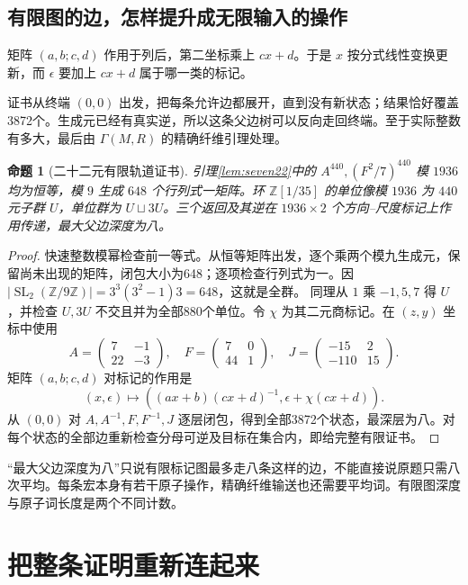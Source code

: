 \documentclass[11pt,a4paper,oneside,openany]{book}
\newcommand{\Z}{\mathbb Z}
\newcommand{\SL}{\operatorname{SL}}
\newtheorem{proposition}[theorem]{命题}
\theoremstyle{definition}
\numberwithin{equation}{chapter}
\begin{document}
\section{有限图的边，怎样提升成无限输入的操作}
矩阵 $(a,b;c,d)$ 作用于列后，第二坐标乘上 $cx+d$。于是 $x$ 按分式线性变换更新，而 $\epsilon$ 要加上 $cx+d$ 属于哪一类的标记。

证书从终端 $(0,0)$ 出发，把每条允许边都展开，直到没有新状态；结果恰好覆盖3872个。生成元已经有真实逆，所以这条父边树可以反向走回终端。至于实际整数有多大，最后由 $\Gamma(M,R)$ 的精确纤维引理处理。
\begin{proposition}[二十二元有限轨道证书]\label{prop:seven-certificate}
引理\ref{lem:seven22}中的 $A^{440},(F^2/7)^{440}$ 模 $1936$ 均为恒等，模 $9$ 生成 $648$ 个行列式一矩阵。环 $\Z[1/35]$ 的单位像模 $1936$ 为 $440$ 元子群 $U$，单位群为 $U\sqcup3U$。三个返回及其逆在 $1936\times2$ 个方向--尺度标记上作用传递，最大父边深度为八。
\end{proposition}
\begin{proof}
快速整数模幂检查前一等式。从恒等矩阵出发，逐个乘两个模九生成元，保留尚未出现的矩阵，闭包大小为648；逐项检查行列式为一。因 $|\SL_2(\Z/9\Z)|=3^3(3^2-1)3=648$，这就是全群。
同理从 $1$ 乘 $-1,5,7$ 得 $U$，并检查 $U,3U$ 不交且并为全部880个单位。令 $\chi$ 为其二元商标记。在 $(z,y)$ 坐标中使用
\[
A=\begin{pmatrix}7&-1\\22&-3\end{pmatrix},\quad
F=\begin{pmatrix}7&0\\44&1\end{pmatrix},\quad
J=\begin{pmatrix}-15&2\\-110&15\end{pmatrix}.
\]
矩阵 $(a,b;c,d)$ 对标记的作用是
\[
(x,\epsilon)\longmapsto((ax+b)(cx+d)^{-1},\epsilon+\chi(cx+d)).
\]
从 $(0,0)$ 对 $A,A^{-1},F,F^{-1},J$ 逐层闭包，得到全部3872个状态，最深层为八。对每个状态的全部边重新检查分母可逆及目标在集合内，即给完整有限证书。
\end{proof}

“最大父边深度为八”只说有限标记图最多走八条这样的边，不能直接说原题只需八次平均。每条宏本身有若干原子操作，精确纤维输送也还需要平均词。有限图深度与原子词长度是两个不同计数。

\chapter{把整条证明重新连起来}\label{sec:completion}
\end{document}
